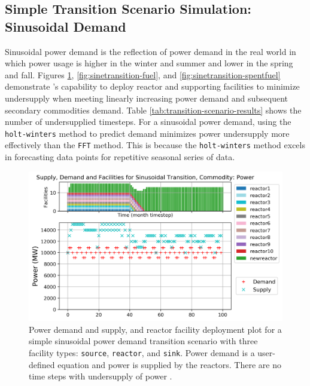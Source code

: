     \subsection{Simple Transition Scenario Simulation: Sinusoidal Demand}
    Sinusoidal power demand is the reflection of power demand in 
    the real world in which power usage is higher in the winter and summer
    and lower in the spring and fall. 
    Figures \ref{fig:sinetransition-power}, \ref{fig:sinetransition-fuel},
    and \ref{fig:sinetransition-spentfuel} demonstrate \deploy's capability 
    to deploy reactor and supporting facilities to minimize undersupply 
    when meeting linearly increasing power demand and subsequent secondary 
    commodities demand. 
    Table \ref{tab:transition-scenario-results} shows the number of 
    undersupplied timesteps.
    For a sinusoidal power demand, using the 
    \texttt{holt-winters} method to predict demand minimizes 
    power undersupply more effectively than the \texttt{FFT} method. 
    This is because the \texttt{holt-winters} method excels in
    forecasting data points for repetitive seasonal series of data. 

    \begin{figure}[]
        \centering
        \includegraphics[width=0.9\linewidth]{figures/sinetransition-power.png} 
            \caption{Power demand and supply, and reactor facility deployment plot for  
            a simple sinusoidal power demand transition scenario with 
            three facility types: \texttt{source}, \texttt{reactor}, and \texttt{sink}.
            Power demand is a user-defined equation and power is supplied by the reactors.
            There are no time steps with undersupply of power \cite{chee_arfc/transition-scenarios_2018}.}
            \label{fig:sinetransition-power}
    \end{figure}
    
